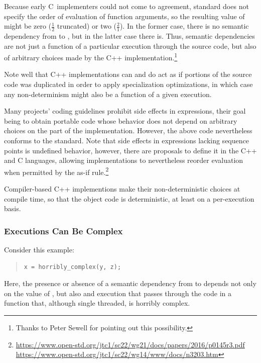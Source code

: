 \documentclass[10]{article}
\begin{document}
Because early C~implementers could not come to agreement, standard
does not specify the order of evaluation of function arguments, so the
resulting value of  might be zero ($\frac{1}{2}$ truncated) or two
($\frac{2}{1}$).
In the former case, there is no semantic dependency from  to
, but in the latter case there is.
Thus, semantic dependencies are not just a function of a particular
execution through the source code, but also of arbitrary choices made
by the C++ implementation.\footnote{
	Thanks to Peter Sewell for pointing out this possibility.}

Note well that C++ implementations can and do act as if portions of
the source code was duplicated in order to apply specialization
optimizations, in which case any non-determinism might also be
a function of a given execution.

Many projects' coding guidelines prohibit side effects in expressions,
their goal being to obtain portable code whose behavior does not depend
on arbitrary choices on the part of the implementation.
However, the above code nevertheless conforms to the standard.
Note that side effects in expressions lacking sequence points is
undefined behavior, however, there are proposals to define it in
the C++ and C languages, allowing implementations to nevertheless reorder
evaluation when permitted by the as-if rule.\footnote{
	\url{https://www.open-std.org/jtc1/sc22/wg21/docs/papers/2016/p0145r3.pdf}
	\url{https://www.open-std.org/jtc1/sc22/wg14/www/docs/n3203.htm}}

Compiler-based C++ implementions make their non-deterministic choices
at compile time, so that the object code is deterministic, at least
on a per-execution basis.

\subsubsection{Executions Can Be Complex}
\label{sec:Executions Can Be Complex}

Consider this example:

\begin{quote}
\begin{verbatim}
x = horribly_complex(y, z);
\end{verbatim}
\end{quote}

Here, the presence or absence of a semantic dependency from  to
 depends not only on the value of , but also and execution
that passes through the code in a function that, although single threaded,
is horribly complex.
\end{document}
